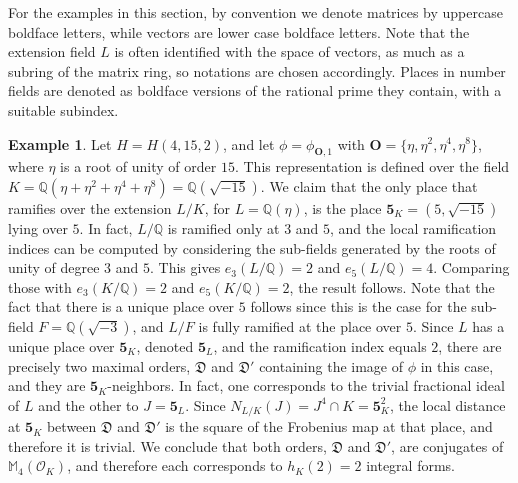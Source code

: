 \documentclass{article}
\theoremstyle{definition}
\newtheorem{ex}[prop]{Example}
\begin{document}
For the examples in this section, by convention we denote
matrices by uppercase boldface letters, while vectors are
lower case boldface letters. Note that the extension field
$L$ is often identified with the space of vectors, as much as
a subring of the matrix ring, so notations are chosen accordingly.
Places in number fields are denoted as boldface versions of the 
rational prime they contain, with a suitable subindex. 

\begin{ex}\label{e0}
    Let $H=H(4,15,2)$, and let 
    $\phi=\phi_{\mathbf{O},1}$ with
    $\mathbf{O}=\{\eta,\eta^2,\eta^4,\eta^8\}$, where $\eta$ is a
    root of unity of order $15$.
    This representation is defined over the field
    $K=\mathbb{Q}(\eta+\eta^2+\eta^4+\eta^8)=
    \mathbb{Q}(\sqrt{-15})$. We claim that the only place that ramifies 
    over the extension $L/K$, for $L=\mathbb{Q}(\eta)$, is the place
    $\mathbf{5}_K=(5,\sqrt{-15})$ lying over $5$.
    In fact, $L/\mathbb{Q}$ is ramified only at $3$ and $5$, and the local 
    ramification indices can be computed by considering the sub-fields 
    generated by the roots of unity of degree $3$ and $5$. This gives
    $e_3(L/\mathbb{Q})=2$ and $e_5(L/\mathbb{Q})=4$. Comparing those with
    $e_3(K/\mathbb{Q})=2$ and $e_5(K/\mathbb{Q})=2$, the result follows.
    Note that the fact that there is a unique place over $5$ follows since
    this is the case for the sub-field $F=\mathbb{Q}(\sqrt{-3})$, and $L/F$
    is fully ramified at the place over $5$.
    Since $L$ has a unique place over $\mathbf{5}_K$, denoted 
    $\mathbf{5}_L$, and the ramification index equals $2$, there
    are precisely two maximal orders, $\mathfrak{D}$
    and $\mathfrak{D}'$ containing the
    image of $\phi$ in this case, and they are 
    $\mathbf{5}_K$-neighbors. In fact, one corresponds to
    the trivial fractional ideal of $L$ and the other to 
    $J=\mathbf{5}_L$. Since $N_{L/K}(J)=J^4\cap K=\mathbf{5}_K^2$,
    the local distance at $\mathbf{5}_K$ between $\mathfrak{D}$ and 
    $\mathfrak{D}'$ is the square of the Frobenius map at that place, 
    and therefore
    it is trivial. We conclude that both orders, $\mathfrak{D}$ and
    $\mathfrak{D}'$, are conjugates of $\mathbb{M}_4(\mathcal{O}_K)$,
    and therefore each corresponds to $h_K(2)=2$ integral forms.
\end{ex}
\end{document}
